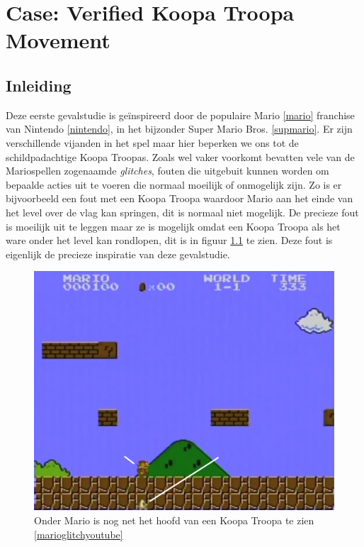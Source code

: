 \chapter{Case: Verified Koopa Troopa Movement}
\label{ch:case-koopa}


\section{Inleiding}

Deze eerste gevalstudie is geïnspireerd door de populaire Mario \ref{mario}
franchise van Nintendo \ref{nintendo}, in het bijzonder Super Mario Bros.
\ref{supmario}. Er zijn verschillende vijanden in het spel maar hier beperken
we ons tot de schildpadachtige Koopa Troopas. Zoals wel vaker voorkomt bevatten
vele van de Mariospellen zogenaamde \emph{glitches}, fouten die uitgebuit
kunnen worden om bepaalde acties uit te voeren die normaal moeilijk of
onmogelijk zijn. Zo is er bijvoorbeeld een fout met een Koopa Troopa waardoor
Mario aan het einde van het level over de vlag kan springen, dit is normaal
niet mogelijk. De precieze fout is moeilijk uit te leggen maar ze is mogelijk
omdat een Koopa Troopa als het ware onder het level kan rondlopen, dit is in
figuur \ref{koopaglitch} te zien. Deze fout is eigenlijk de precieze inspiratie
van deze gevalstudie.

\begin{figure}
  \centering
  \includegraphics[width=\linewidth]{figures/KoopaTroopaGlitch}
  \caption{Onder Mario is nog net het hoofd van een Koopa Troopa te zien
           \ref{marioglitchyoutube}}
  \label{koopaglitch}
\end{figure}

